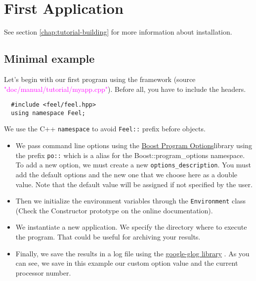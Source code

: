 %


\section{First \feel Application}
\label{sec:myapp}

See section \ref{chap:tutorial-building} for more information about \feel installation.

\subsection{Minimal example}

Let's begin with our first program using the \feel framework
(source \textcolor{magenta}{"doc/manual/tutorial/myapp.cpp"}).
Before all, you have to include the \feel headers.
%
\vspace{2mm}
\begin{lstlisting}
  #include <feel/feel.hpp>
  using namespace Feel;
\end{lstlisting}
\vspace{2mm}
%
We use the C++ \lstinline!namespace! to avoid \lstinline!Feel::! prefix before
\feel objects.
%
\vspace{2mm}

\vspace{2mm}
%
\begin{itemize}
\item
We pass command line options using the
\href{http://www.boost.org/doc/libs/1_53_0/doc/html/program_options.html}
{Boost Program Options}\footnotemark[1] library using the prefix \lstinline!po::! which is 
a \feel alias for the Boost::program\_options namespace.
%
%
To add a new \feel option, we must create a new
\feel \lstinline!options_description!. You must add the default \feel options
and the new one that we choose here as a double value. Note that the default
value will be assigned if not specified by the user.

\item
Then we initialize the environment variables through the \feel
\lstinline!Environment! class (Check the Constructor prototype on the online documentation).

\item
We instantiate a new application. We specify the directory where to execute the
program. That could be useful for archiving your results.

\item
Finally, we save the results in a log file using the
\href{http://code.google.com/p/google-glog/}{google-glog library}
\footnotemark[2].
%
%
As you can see, we save in this example our custom option value and the
current processor number.

\end{itemize}


